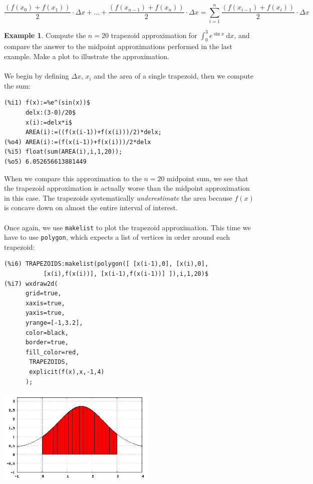 \documentclass[10.5pt,twoside]{report}
\theoremstyle{definition}
\newtheorem{exmp}{Example}[section]
\begin{document}
\[\frac{\left(f(x_{0})+f(x_1)\right)}{2}\cdot \Delta x+
\dots +
\frac{\left(f(x_{n-1})+f(x_n)\right)}{2}\cdot \Delta x=
\sum_{i=1}^{n} \frac{\left(f(x_{i-1})+f(x_i)\right)}{2}\cdot \Delta x\]

\begin{exmp} Compute the $n=20$ trapezoid approximation for $\displaystyle \int_0^3 e^{\sin{x}}\ \mathrm{d}x$, and compare the answer to the midpoint approximations performed in the last example.  Make a plot to illustrate the approximation.\\
${}$\\

We begin by defining $\Delta x$, $x_i$ and the area of a single trapezoid, then we compute the sum:

\begin{verbatim}
(%i1) f(x):=%e^(sin(x))$
      delx:(3-0)/20$
      x(i):=delx*i$
      AREA(i):=((f(x(i-1))+f(x(i)))/2)*delx;
(%o4) AREA(i):=(f(x(i-1))+f(x(i)))/2*delx
(%i5) float(sum(AREA(i),i,1,20));
(%o5) 6.052656613881449
\end{verbatim}

When we compare this approximation to the $n=20$ midpoint sum, we see that the trapezoid approximation is actually worse than the midpoint approximation in this case.  The trapezoids systematically \textit{underestimate} the area because $f(x)$ is concave down on almost the entire interval of interest.  \\

${}$\\
Once again, we use \verb|makelist| to plot the trapezoid approximation.  This time we have to use \verb|polygon|, which expects a list of vertices in order around each trapezoid:\\

\begin{verbatim}
(%i6) TRAPEZOIDS:makelist(polygon([ [x(i-1),0], [x(i),0], 
           [x(i),f(x(i))], [x(i-1),f(x(i-1))] ]),i,1,20)$
(%i7) wxdraw2d(
      grid=true,
      xaxis=true,
      yaxis=true,
      yrange=[-1,3.2],
      color=black,
      border=true,
      fill_color=red,
       TRAPEZOIDS,
       explicit(f(x),x,-1,4)
      );
\end{verbatim}


\includegraphics[width=3in]{example_2_2_1_1}



\end{exmp}
\end{document}
